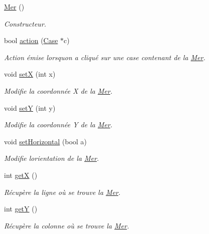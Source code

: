 \begin{DoxyCompactItemize}
\item 
\hyperlink{class_mer_ace88286368f6f30f2462de952083bcd0}{Mer} ()
\begin{DoxyCompactList}\small\item\em Constructeur. \end{DoxyCompactList}\item 
bool \hyperlink{class_mer_aa30fffa94a8e0d5be6ae503aa8392973}{action} (\hyperlink{class_case}{Case} $\ast$c)
\begin{DoxyCompactList}\small\item\em Action émise lorsqu\textquotesingle{}on a cliqué sur une case contenant de la \hyperlink{class_mer}{Mer}. \end{DoxyCompactList}\item 
void \hyperlink{class_mer_ab20617d436898cc631fc1842e897de0c}{setX} (int x)
\begin{DoxyCompactList}\small\item\em Modifie la coordonnée X de la \hyperlink{class_mer}{Mer}. \end{DoxyCompactList}\item 
void \hyperlink{class_mer_a13ac62cb31e498d5bcf786d5a0d196ed}{setY} (int y)
\begin{DoxyCompactList}\small\item\em Modifie la coordonnée Y de la \hyperlink{class_mer}{Mer}. \end{DoxyCompactList}\item 
void \hyperlink{class_mer_a3244c63c7b077ef84e593d9b5e5f4472}{set\+Horizontal} (bool a)
\begin{DoxyCompactList}\small\item\em Modifie l\textquotesingle{}orientation de la \hyperlink{class_mer}{Mer}. \end{DoxyCompactList}\item 
int \hyperlink{class_mer_a668a9c3acfa903bb7c8e1d607e1229a4}{getX} ()
\begin{DoxyCompactList}\small\item\em Récupère la ligne où se trouve la \hyperlink{class_mer}{Mer}. \end{DoxyCompactList}\item 
int \hyperlink{class_mer_a41f5d00f824057af9c9b57d666bf6fcc}{getY} ()
\begin{DoxyCompactList}\small\item\em Récupère la colonne où se trouve la \hyperlink{class_mer}{Mer}. \end{DoxyCompactList}\item 

\end{DoxyCompactItemize}
